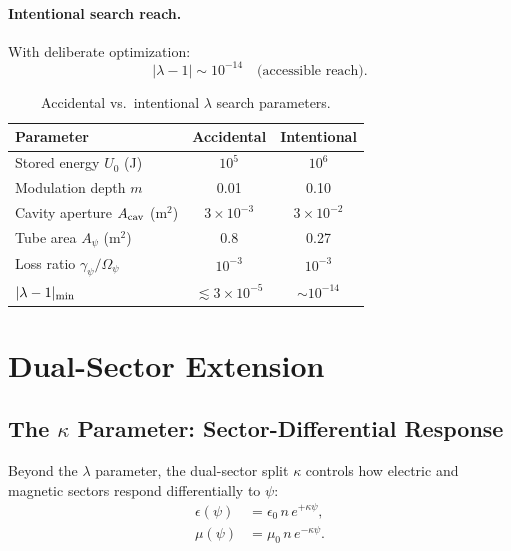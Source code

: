 \documentclass[aps,prd,twocolumn,superscriptaddress,floatfix,nofootinbib]{revtex4-2}
\newcommand{\Opsi}{\Omega_\psi}
\newcommand{\gpsi}{\gamma_\psi}
\newcommand{\lam}{\lambda}
\begin{document}
\paragraph{Intentional search reach.}
With deliberate optimization:
\begin{equation}
\boxed{|\lam - 1| \sim 10^{-14} \quad \text{(accessible reach)}}.
\label{eq:intentional-reach}
\end{equation}

\begin{table}[h]
\caption{Accidental vs.\ intentional $\lambda$ search parameters.}
\label{tab:lambda-params}
\begin{ruledtabular}
\begin{tabular}{lcc}
Parameter & Accidental & Intentional \\
\hline
Stored energy $U_0$ (J) & $10^5$ & $10^6$ \\
Modulation depth $m$ & 0.01 & 0.10 \\
Cavity aperture $A_{\rm cav}$ (m$^2$) & $3\times10^{-3}$ & $3\times10^{-2}$ \\
Tube area $A_\psi$ (m$^2$) & 0.8 & 0.27 \\
Loss ratio $\gpsi/\Opsi$ & $10^{-3}$ & $10^{-3}$ \\
\hline
$|\lam-1|_{\rm min}$ & $\lesssim 3\times10^{-5}$ & $\sim 10^{-14}$ \\
\end{tabular}
\end{ruledtabular}
\end{table}

\section{Dual-Sector Extension}\label{sec:dual-sector}

\subsection{The $\kappa$ Parameter: Sector-Differential Response}

Beyond the $\lambda$ parameter, the dual-sector split $\kappa$ controls
how electric and magnetic sectors respond differentially to $\psi$:
\begin{align}
\epsilon(\psi) &= \epsilon_0\,n\,e^{+\kappa\psi}, \label{eq:eps-split}\\
\mu(\psi) &= \mu_0\,n\,e^{-\kappa\psi}. \label{eq:mu-split}
\end{align}
\end{document}
